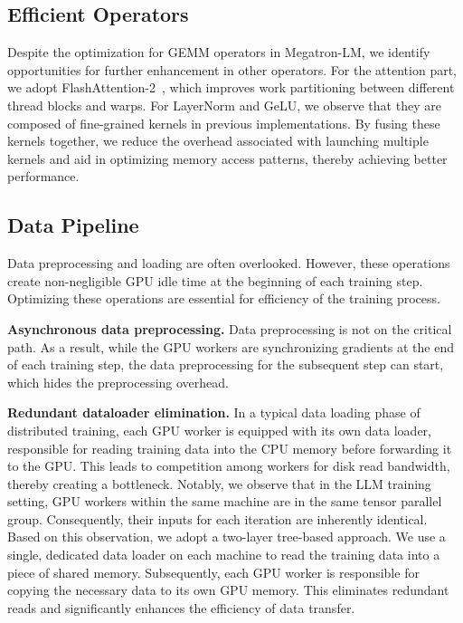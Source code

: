 \documentclass[letterpaper,twocolumn,10pt]{article}
\newcommand{\parabf}[1]{\medskip\noindent\textbf{#1}}
\begin{document}
\subsection{Efficient Operators}

Despite the optimization for GEMM operators in Megatron-LM, we identify
opportunities for further enhancement in other operators. For the attention part,
we adopt FlashAttention-2~\cite{dao2023flashattention}, which improves
work partitioning between different thread blocks and warps. For LayerNorm and GeLU, we observe that they
are composed of fine-grained kernels in previous implementations. By fusing
these kernels together, we reduce the overhead associated with launching
multiple kernels and aid in optimizing memory access patterns, thereby
achieving better performance.

\subsection{Data Pipeline}
\label{sec:data}

Data preprocessing and loading are often overlooked. However, these operations
create non-negligible GPU idle time at the beginning of each training step.
Optimizing these operations are essential for efficiency of the training
process.

\parabf{Asynchronous data preprocessing.} Data preprocessing is not on the
critical path. As a result, while the GPU workers are synchronizing gradients at
the end of each training step, the data preprocessing for the subsequent step
can start, which hides the preprocessing overhead.

\parabf{Redundant dataloader elimination.} In a typical data loading phase of
distributed training, each GPU worker is equipped with its own data loader,
responsible for reading training data into the CPU memory before forwarding it
to the GPU. This leads to competition among workers for disk read bandwidth,
thereby creating a bottleneck. Notably, we observe that in the LLM training
setting, GPU workers within the same machine are in the same tensor parallel
group. Consequently, their inputs for each iteration are inherently identical.
Based on this observation, we adopt a two-layer tree-based approach.
We use a single, dedicated data loader on each machine to read the
training data into a piece of shared memory. Subsequently, each GPU worker is
responsible for copying the necessary data to its own GPU memory. This
eliminates redundant reads and significantly enhances the efficiency of data
transfer.
\end{document}
